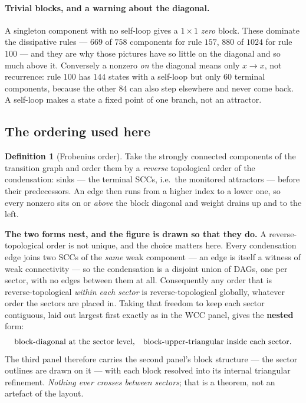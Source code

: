 \documentclass[11pt]{article}
\theoremstyle{plain}
\theoremstyle{definition}
\newtheorem{definition}{Definition}
\begin{document}
\paragraph{Trivial blocks, and a warning about the diagonal.} A singleton
component with no self-loop gives a $1\times1$ \emph{zero} block. These dominate
the dissipative rules --- $669$ of $758$ components for rule $157$, $880$ of
$1024$ for rule $100$ --- and they are why those pictures have so little on the
diagonal and so much above it. Conversely a nonzero \emph{on} the diagonal means
only $x\to x$, not recurrence: rule $100$ has $144$ states with a self-loop but
only $60$ terminal components, because the other $84$ can also step elsewhere and
never come back. A self-loop makes a state a fixed point of one branch, not an
attractor.

\subsection{The ordering used here}

\begin{definition}[Frobenius order]
Take the strongly connected components of the transition graph and order them by
a \emph{reverse} topological order of the condensation: sinks --- the terminal
SCCs, i.e.\ the monitored attractors --- before their predecessors. An edge then
runs from a higher index to a lower one, so every nonzero sits on or
\emph{above} the block diagonal and weight drains up and to the left.
\end{definition}

\noindent\textbf{The two forms nest, and the figure is drawn so that they do.}
A reverse-topological order is not unique, and the choice matters here. Every
condensation edge joins two SCCs of the \emph{same} weak component --- an edge
is itself a witness of weak connectivity --- so the condensation is a disjoint
union of DAGs, one per sector, with no edges between them at all. Consequently
any order that is reverse-topological \emph{within each sector} is
reverse-topological globally, whatever order the sectors are placed in. Taking
that freedom to keep each sector contiguous, laid out largest first exactly as in
the WCC panel, gives the \textbf{nested} form:
\[
\text{block-diagonal at the sector level,\quad block-upper-triangular inside
each sector.}
\]
The third panel therefore carries the second panel's block structure --- the
sector outlines are drawn on it --- with each block resolved into its internal
triangular refinement. \emph{Nothing ever crosses between sectors}; that is a
theorem, not an artefact of the layout.
\end{document}
